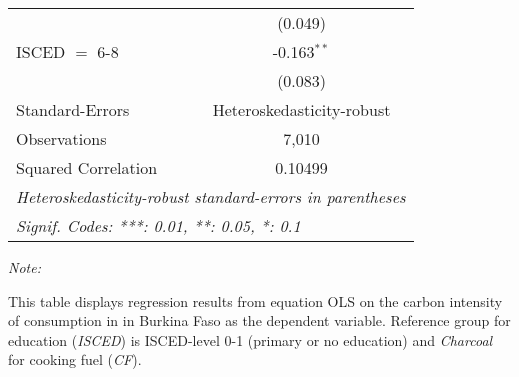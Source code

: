\begin{table}[htbp!]
\begin{adjustbox}{width = 1\textwidth, max height = 0.95\textheight, center}
\begin{threeparttable}[b]
\begin{tabular}{lc}
                                & (0.049)\\   
            ISCED $=$ 6-8       & -0.163$^{**}$\\   
                                & (0.083)\\   
            \midrule 
            Standard-Errors     & Heteroskedasticity-robust \\   
            Observations        & 7,010\\  
            Squared Correlation & 0.10499\\  
            \midrule \midrule
            \multicolumn{2}{l}{\emph{Heteroskedasticity-robust standard-errors in parentheses}}\\
            \multicolumn{2}{l}{\emph{Signif. Codes: ***: 0.01, **: 0.05, *: 0.1}}\\
         \end{tabular}
         
         \begin{tablenotes}\item \medskip \textit{Note:}
            \item This table displays regression results from equation OLS on the carbon intensity of consumption in  in Burkina Faso as the dependent variable. Reference group for education (\textit{ISCED}) is ISCED-level 0-1 (primary or no education) and \textit{Charcoal} for cooking fuel (\textit{CF}).
         \end{tablenotes}
      \end{threeparttable}
   \end{adjustbox}
\end{table}


